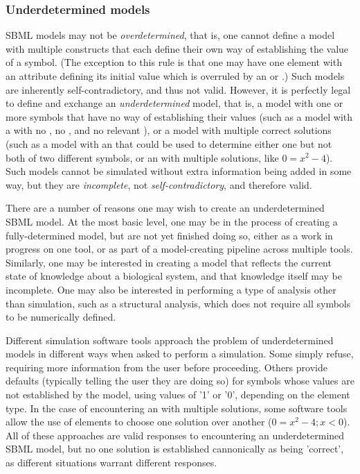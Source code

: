 \begin{blockChanged}
\subsubsection{Underdetermined models}
\label{sec:underdetermined}

SBML models may not be \emph{overdetermined}, that is, one cannot define a model with multiple constructs that each define their own way of establishing the value of a symbol.  (The exception to this rule is that one may have one element with an attribute defining its initial value which is overruled by an \InitialAssignment or \Rule.)  Such models are inherently self-contradictory, and thus not valid.  However, it is perfectly legal to define and exchange an \emph{underdetermined} model, that is, a model with one or more symbols that have no way of establishing their values (such as a model with a \Parameter with no , no \InitialAssignment, and no relevant \Rule), or a model with multiple correct solutions (such as a model with an \AlgebraicRule that could be used to determine either one but not both of two different symbols, or an \AlgebraicRule with multiple solutions, like $0=x^2-4$).  Such models cannot be simulated without extra information being added in some way, but they are \emph{incomplete}, not \emph{self-contradictory}, and therefore valid.

There are a number of reasons one may wish to create an underdetermined SBML model.  At the most basic level, one may be in the process of creating a fully-determined model, but are not yet finished doing so, either as a work in progress on one tool, or as part of a model-creating pipeline across multiple tools.  Similarly, one may be interested in creating a model that reflects the current state of knowledge about a biological system, and that knowledge itself may be incomplete.  One may also be interested in performing a type of analysis other than simulation, such as a structural analysis, which does not require all symbols to be numerically defined.

Different simulation software tools approach the problem of underdetermined models in different ways when asked to perform a simulation.  Some simply refuse, requiring more information from the user before proceeding.  Others provide defaults (typically telling the user they are doing so) for symbols whose values are not established by the model, using values of '1' or '0', depending on the element type.  In the case of encountering an \AlgebraicRule with multiple solutions, some software tools allow the use of \Constraint elements to choose one solution over another ($0=x^2-4; x<0$).  All of these approaches are valid responses to encountering an underdetermined SBML model, but no one solution is established cannonically as being 'correct', as different situations warrant different responses.

\end{blockChanged}


